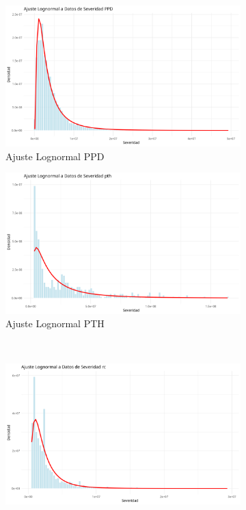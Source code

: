 \begin{figure}[H]
    \centering
    \begin{subfigure}{0.45\textwidth}
        \includegraphics[width=\textwidth]{../images/ajuste_lognormal_ppd.png}
        \caption{Ajuste Lognormal PPD}
    \end{subfigure}
    \hfill
    \begin{subfigure}{0.45\textwidth}
        \includegraphics[width=\textwidth]{../images/ajuste_lognormal_pth.png}
        \caption{Ajuste Lognormal PTH}
    \end{subfigure}
    \\[0.5em]
    \begin{subfigure}{0.45\textwidth}
        \includegraphics[width=\textwidth]{../images/ajuste_lognormal_rc.png}

\end{subfigure}
\end{figure}
